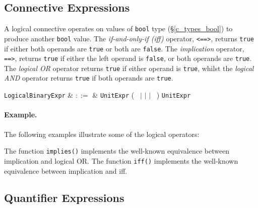 
\subsection{Connective Expressions}
\label{c_expr_logical_binary}

A logical connective operates on values of \lstinline{bool} type (\S\ref{c_types_bool}) to produce another \lstinline{bool} value.  The {\em if-and-only-if (iff)} operator, \lstinline{<==>}, returns \lstinline{true} if either both operands are \lstinline{true} or both are \lstinline{false}.  The {\em implication} operator, \lstinline{==>}, returns \lstinline{true} if either the left operand is \lstinline{false}, or both operands are \lstinline{true}.  The {\em logical OR} operator returns \lstinline{true} if either operand is \lstinline{true}, whilst the {\em logical AND} operator returns \lstinline{true} if both operands are \lstinline{true}.

\begin{syntax}

  \verb+LogicalBinaryExpr+ & $::=$ & \verb+UnitExpr+ \big(\ \token{<==>} $|$ \token{==>} $|$ \token{\&\&} $|$ \token{||}\ \big) \verb+UnitExpr+\\
\end{syntax}

\paragraph{Example.}  The following examples illustrate some of the logical operators:



The function \lstinline{implies()} implements the well-known equivalence between implication and logical OR.  The function \lstinline{iff()} implements the well-known equivalence between implication and iff.


\subsection{Quantifier Expressions}
\label{c_expr_quantifier}

